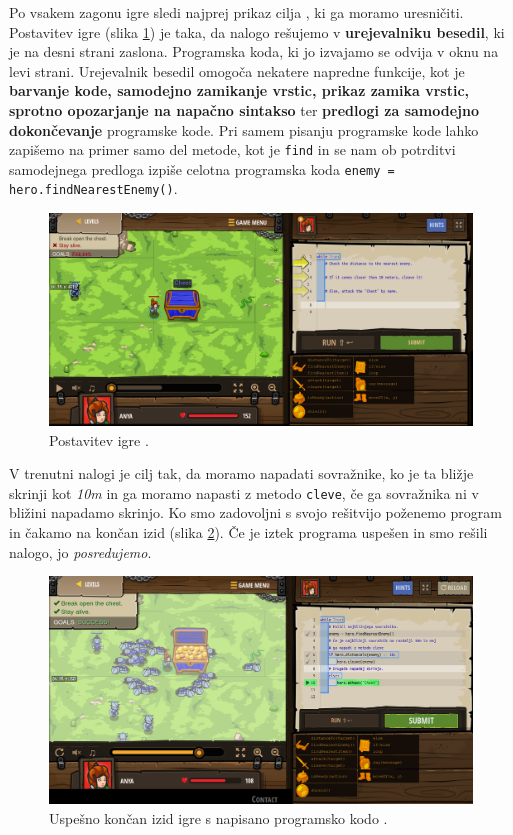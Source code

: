 Po vsakem zagonu igre sledi najprej prikaz cilja , ki ga moramo
uresničiti. Postavitev igre (slika \ref{fig:web:cc:ingame:game}) je
taka, da nalogo rešujemo v \textbf{urejevalniku besedil}, ki je na
desni strani zaslona. Programska koda, ki jo izvajamo se odvija v oknu
na levi strani. Urejevalnik besedil omogoča nekatere napredne
funkcije, kot je \textbf{barvanje kode, samodejno zamikanje vrstic,
  prikaz zamika vrstic, sprotno opozarjanje na napačno sintakso} ter
\textbf{predlogi za samodejno dokončevanje} programske kode. Pri samem
pisanju programske kode lahko zapišemo na primer samo del metode, kot
je \texttt{find} in se nam ob potrditvi samodejnega predloga izpiše
celotna programska koda \texttt{enemy = hero.findNearestEnemy()}.

\begin{figure}[h!]
  \centering
    \includegraphics [width=0.55\linewidth, keepaspectratio =
   1] {./images/sc_web/cc_ingame-game-v01.png}
   \caption{Postavitev igre \cite{web:codecombat}.}
   \label{fig:web:cc:ingame:game}
 \end{figure}

 V trenutni nalogi je cilj tak, da moramo napadati sovražnike, ko je
 ta bližje skrinji kot \emph{10m} in ga moramo napasti z metodo
 \texttt{cleve}, če ga sovražnika ni v bližini napadamo skrinjo. Ko
 smo zadovoljni s svojo rešitvijo poženemo program in čakamo na končan
 izid (slika \ref{fig:web:cc:ingame:game2}). Če je iztek programa
 uspešen in smo rešili nalogo, jo \emph{posredujemo}.

\begin{figure}[h!]
  \centering
    \includegraphics [width=0.55\linewidth, keepaspectratio =
   1] {./images/sc_web/cc_ingame-game-v02.png}
   \caption{Uspešno končan izid igre s napisano programsko
     kodo \cite{web:codecombat}.}
   \label{fig:web:cc:ingame:game2}
 \end{figure}
 
